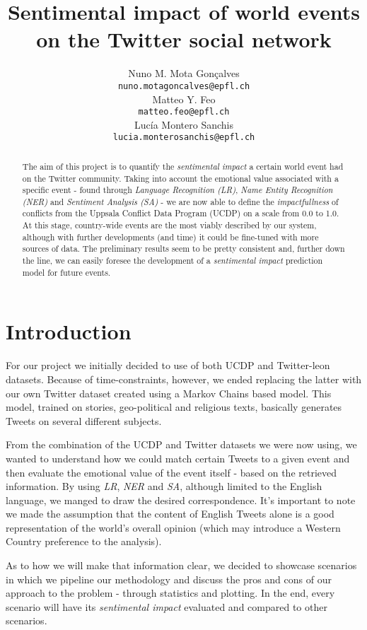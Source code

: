 \documentclass[11pt]{article}
\title{Sentimental impact of world events on the Twitter social network}
\author{Nuno M. Mota Gon\c{c}alves \\
	{\tt \small nuno.motagoncalves@epfl.ch} \\\And
	Matteo Y. Feo \\
	{\tt \small matteo.feo@epfl.ch} \\\And
	Luc\'{i}a Montero Sanchis\\
	{\tt \small lucia.monterosanchis@epfl.ch} \\}
\date{}
\begin{document}
	\maketitle
	\begin{abstract}
		The aim of this project is to quantify the \textit{sentimental impact} a certain
		world event had on the Twitter community. Taking into account the emotional
		value associated with a specific event - found through \textit{Language
			Recognition (LR)}, \textit{Name Entity Recognition (NER)} and \textit{Sentiment
			Analysis (SA)} - we are now able to define the \textit{impactfullness} of
		conflicts from the Uppsala Conflict Data Program (UCDP) on a scale from 0.0 to
		1.0. At this stage, country-wide events are the most viably described by our
		system, although with further developments (and time) it could be fine-tuned
		with more sources of data. The preliminary results seem to be pretty consistent
		and, further down the line, we can easily foresee the development of a
		\textit{sentimental impact} prediction model for future events.
	\end{abstract}
	
	\section{Introduction}
	
	For our project we initially decided to use of both UCDP and Twitter-leon
	datasets. Because of time-constraints, however, we ended replacing the latter
	with our own Twitter dataset created using a Markov Chains based model. This
	model, trained on stories, geo-political and religious texts, basically
	generates Tweets on several different subjects.
	
	From the combination of the UCDP and Twitter datasets we were now using, we
	wanted to understand how we could match certain Tweets to a given event and then
	evaluate the emotional value of the event itself - based on the retrieved
	information. By using \textit{LR}, \textit{NER} and \textit{SA}, although
	limited to the English language, we manged to draw the desired correspondence.
	It's important to note we made the assumption that the content of English Tweets
	alone is a good representation of the world's overall opinion (which may
	introduce a Western Country preference to the analysis).
	
	As to how we will make that information clear, we decided to showcase scenarios
	in which we pipeline our methodology and discuss the pros and cons of our
	approach to the problem - through statistics and plotting. In the end, every
	scenario will have its \textit{sentimental impact} evaluated and compared to
	other scenarios.
	
\end{document}
